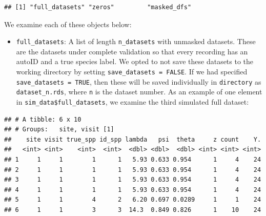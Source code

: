 \documentclass[
]{article}
\newenvironment{Shaded}{\begin{snugshade}}{\end{snugshade}}
\newcommand{\CommentTok}[1]{\textcolor[rgb]{0.56,0.35,0.01}{\textit{#1}}}
\newcommand{\DecValTok}[1]{\textcolor[rgb]{0.00,0.00,0.81}{#1}}
\newcommand{\FunctionTok}[1]{\textcolor[rgb]{0.13,0.29,0.53}{\textbf{#1}}}
\newcommand{\NormalTok}[1]{#1}
\newcommand{\OtherTok}[1]{\textcolor[rgb]{0.56,0.35,0.01}{#1}}
\newcommand{\SpecialCharTok}[1]{\textcolor[rgb]{0.81,0.36,0.00}{\textbf{#1}}}
\providecommand{\tightlist}{%
  \setlength{\itemsep}{0pt}\setlength{\parskip}{0pt}}
\begin{document}
\begin{verbatim}
## [1] "full_datasets" "zeros"         "masked_dfs"
\end{verbatim}

\linespread{1}

We examine each of these objects below:

\begin{itemize}
\tightlist
\item
  \texttt{full\_datasets}: A list of length \texttt{n\_datasets} with unmasked datasets. These are the datasets under complete validation so that every recording has an autoID and a true species label. We opted to not save these datasets to the working directory by setting \texttt{save\_datasets\ =\ FALSE}. If we had specified \texttt{save\_datasets\ =\ TRUE}, then these will be saved individually in \texttt{directory} as \texttt{dataset\_n.rds}, where \texttt{n} is the dataset number. As an example of one element in \texttt{sim\_data\$full\_datasets}, we examine the third simulated full dataset:
\end{itemize}

\linespread{1}

\begin{Shaded}
\end{Shaded}

\begin{verbatim}
## # A tibble: 6 x 10
## # Groups:   site, visit [1]
##    site visit true_spp id_spp lambda   psi  theta     z count    Y.
##   <int> <int>    <int>  <int>  <dbl> <dbl>  <dbl> <int> <int> <int>
## 1     1     1        1      1   5.93 0.633 0.954      1     4    24
## 2     1     1        1      1   5.93 0.633 0.954      1     4    24
## 3     1     1        1      1   5.93 0.633 0.954      1     4    24
## 4     1     1        1      1   5.93 0.633 0.954      1     4    24
## 5     1     1        4      2   6.20 0.697 0.0289     1     1    24
## 6     1     1        3      3  14.3  0.849 0.826      1    10    24
\end{verbatim}

\linespread{1}
\end{document}
